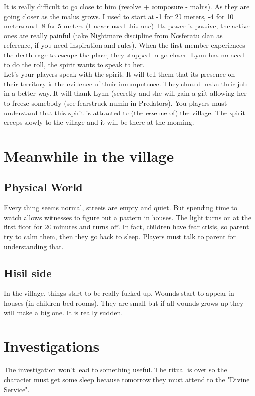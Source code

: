 \documentclass[oneside,12pt]{book}
\begin{document}
\begin{flushleft}
It is really difficult to go close to him (resolve + composure - malus). As they are going closer as the malus grows. I used to start at -1 for 20 meters, -4 for 10 meters and -8 for 5 meters (I never used this one). Its power is passive, the active ones are really painful (take Nightmare discipline from Nosferatu clan as reference, if you need inspiration and rules). When the first member experiences the death rage to escape the place, they stopped to go closer.  
Lynn has no need to do the roll, the spirit wants to speak to her.\\

Let's your players speak with the spirit. It will tell them that its presence on their territory is the evidence of their incompetence. They should make their job in a better way. It will thank Lynn (secretly and she will gain a gift allowing her to freeze somebody (see fearstruck numin in Predators).
You players must understand that this spirit is attracted to (the essence of) the village. The spirit creeps slowly to the village and it will be there at the morning.

\section{Meanwhile in the village}
\subsection{Physical World}
Every thing seems normal, streets are empty and quiet. But spending time to watch allows witnesses to figure out a pattern in houses. The light turns on at the first floor for 20 minutes and turns off. In fact, children have fear crisis, so parent try to calm them, then they go back to sleep. Players must talk to parent for understanding that. 

\subsection{Hisil side}
In the village, things start to be really fucked up. Wounds start to appear in houses (in children bed rooms). They are small but if all wounds grows up they will make a big one.
It is really sudden. 

\section{Investigations}
The investigation won't lead to something useful. The ritual is over so the character must get some sleep because tomorrow they must attend to the "Divine Service".


\end{flushleft}
\end{document}
